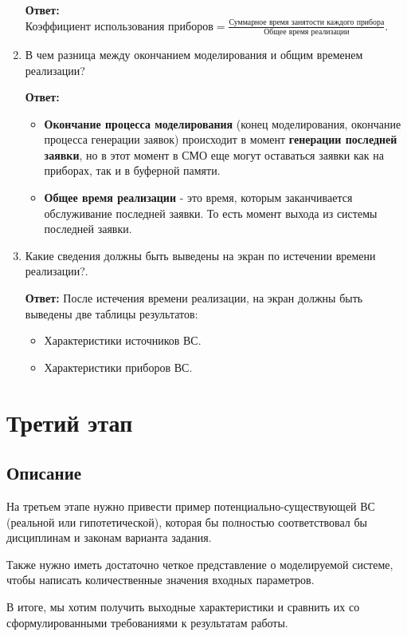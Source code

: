 \documentclass[a4paper, 14pt]{article}
\begin{document}
\begin{enumerate}
	      \textbf{Ответ:} $\text{Коэффициент использования приборов} = \frac{\text{Суммарное время занятости каждого прибора}}{\text{Общее время реализации}}$.
	\item В чем разница между окончанием моделирования и общим временем реализации?

	      \textbf{Ответ:}
	      \begin{itemize}
		      \item \textbf{Окончание процесса моделирования} (конец моделирования, окончание процесса генерации заявок) происходит в момент \textbf{генерации последней заявки}, но в этот момент в СМО еще могут оставаться заявки как на приборах, так и в буферной памяти.
		      \item \textbf{Общее время реализации} - это время, которым заканчивается обслуживание последней заявки. То есть момент выхода из системы последней заявки.
	      \end{itemize}
	\item Какие сведения должны быть выведены на экран по истечении времени реализации?.

	      \textbf{Ответ:} После истечения времени реализации, на экран должны быть выведены две таблицы результатов:
	      \begin{itemize}
		      \item Характеристики источников ВС.
		      \item Характеристики приборов ВС.
	      \end{itemize}
\end{enumerate}

\section{Третий этап}

\subsection{Описание}

На третьем этапе нужно привести пример потенциально-существующей ВС (реальной или гипотетической), которая бы полностью соответствовал бы дисциплинам и законам варианта задания.

Также нужно иметь достаточно четкое представление о моделируемой системе, чтобы написать количественные значения входных параметров.

В итоге, мы хотим получить выходные характеристики и сравнить их со сформулированными требованиями к результатам работы.
\end{document}
